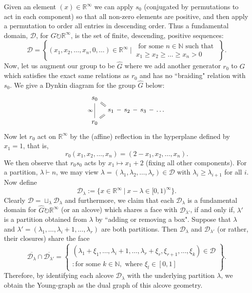 \documentclass{article}
\theoremstyle{definition}
\def\N{\mathbb{N}}
\def\l{\lambda}
\def\R{\mathbb{R}}
\numberwithin{equation}{subsection}
\begin{document}
{{Given an element $(x)\in \R^\infty$ we can apply $s_0$ (conjugated by permutations to act in each component) so that all non-zero elements are positive, and then apply a permutation to order all entries in descending order. Thus a fundamental domain, $\mathcal{D}$, for $G\circlearrowright \R^\infty$, is the set of finite, descending, positive sequences:
\[\mathcal{D}= \left\{(x_1,x_2,\dots, x_n,0,\dots) \in \R^\infty \ \Bigg| \ \begin{matrix}\text{ for some } n\in \N \text{ such that }\\ x_1\geq x_2\geq \dots \geq x_n>0\end{matrix} \right\}.\]
Now, let us augment our group to be $\hat{G}$ where we add another generator $r_0$ to $G$ which satisfies the exact same relations as $r_0$ and has no ``braiding" relation with $s_0$. We give a Dynkin diagram for the group $\hat{G}$ below:
\[ \begin{tikzcd}[column sep=tiny,row sep = tiny]
    s_0\ar[dr,equal]\\
    &s_1\ar[r,dash]&s_2\ar[r,dash]&s_3\ar[r,dash]&\dots\\
    r_0\ar[ur,equal]\ar[uu,dash,"\infty"]
\end{tikzcd}\]
Now let $r_0$ act on $\R^\infty$ by the (affine) reflection in the hyperplane defined by $x_1=1$, that is,
\[r_0(x_1,x_2,\dots,x_n)=(2-x_1,x_2,\dots,x_n).\]
We then observe that $r_0 s_0$ acts by $x_1\mapsto x_1+2$ (fixing all other components). For a partition, $\l\vdash n$, we may view $\l=(\l_1,\l_2,\dots, \l_r)\in \mathcal{D}$ with $\l_i\geq \l_{i+1}$ for all $i$. Now define
\[\mathcal{D}_{\l}:=\{x\in \R^\infty \ | \ x-\l \in [0,1)^\infty  \}.\]
Clearly $\mathcal{D}=\sqcup_{\l} \mathcal{D}_{\l}$ and furthermore, we claim that each $\mathcal{D}_{\l}$ is a fundamental domain for $\hat{G}\circlearrowright \R^\infty$ (or an alcove) which shares a face with $\mathcal{D}_{\l'}$, if and only if, $\l'$ is a partition obtained from $\l$ by ``adding or removing a box". Suppose that $\l$ and $\l'=(\l_1,\dots,\l_i+1,\dots ,\l_r)$ are both partitions. Then $\mathcal{D}_{\l}$ and $\mathcal{D}_{\l'}$ (or rather, their closures) share the face
\[\overline{\mathcal{D}_{\l}}\cap\overline{\mathcal{D}_{\l'}}=\left\{\begin{matrix}(\l_1+\xi_1,\dots,\l_i+1,\dots,\l_r+\xi_r,\xi_{r+1},\dots,\xi_k)\in \mathcal{D}  \\ :\text{for some } k \in \N, \text{ where } \xi_l\in [0,1]\end{matrix} \right\}.\]
Therefore, by identifying each alcove $\mathcal{D}_{\l}$ with the underlying partition $\l$, we obtain the Young-graph as the dual graph of this alcove geometry.



 
}} 



\end{document}
